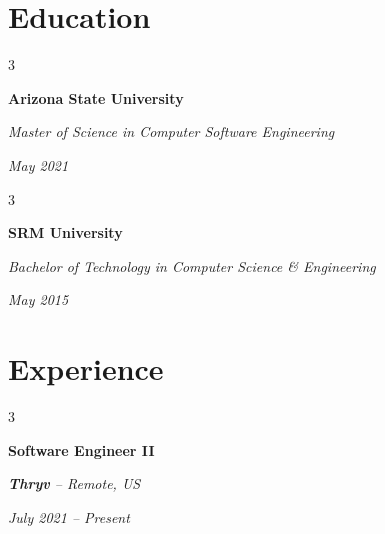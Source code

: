 \documentclass[10pt]{article}
\newenvironment{threecolentry}[3]{
    \onecolentry
    \def\firstColumn{#1}
    \def\secondColumn{#2}
    \def\thirdColumn{#3}
    \setcolumnwidth{6cm, 11.5cm, 5cm}
    \begin{paracol}{3}
    \firstColumn
}{
    \switchcolumn[1] \centering \secondColumn
    \switchcolumn[2] \raggedleft \thirdColumn
    \end{paracol}
    \endonecolentry
}
\begin{document}
    \section{Education}

        \begin{threecolentry}{
            \raggedright\textbf{Arizona State University}
            }{
            \centering\textit{Master of Science in Computer Software Engineering}
            }{
            \raggedleft\textit{May 2021}
            }
        \end{threecolentry}

        \vspace{0.10 cm}

        \begin{threecolentry}{
            \raggedright\textbf{SRM University}
            }{
            \centering\textit{Bachelor of Technology in Computer Science \& Engineering}
            }{
            \raggedleft\textit{May 2015}
            }
        \end{threecolentry}

    \section{Experience}

        \begin{threecolentry}{
            \raggedright\textbf{Software Engineer II}
            }{
            \centering\textit{\textbf{Thryv} -- Remote, US}
            }{
            \raggedleft\textit{July 2021 -- Present}
            }
        \end{threecolentry}
\end{document}
